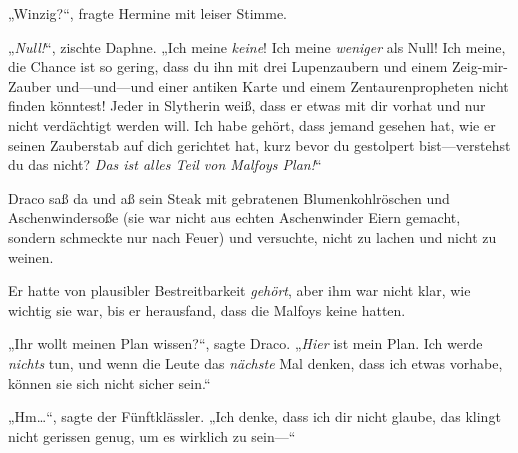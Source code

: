 „Winzig?“, fragte Hermine mit leiser Stimme.

„\emph{Null!}“, zischte Daphne. „Ich meine \emph{keine}! Ich meine \emph{weniger} als Null! Ich meine, die Chance ist so gering, dass du ihn mit drei Lupenzaubern und einem Zeig-mir-Zauber und—und—und einer antiken Karte und einem Zentaurenpropheten nicht finden könntest! Jeder in Slytherin weiß, dass er etwas mit dir vorhat und nur nicht verdächtigt werden will. Ich habe gehört, dass jemand gesehen hat, wie er seinen Zauberstab auf dich gerichtet hat, kurz bevor du gestolpert bist—verstehst du das nicht? \emph{Das ist alles Teil von Malfoys Plan!}“

\later

Draco saß da und aß sein Steak mit gebratenen Blumenkohlröschen und Aschenwindersoße (sie war nicht aus echten Aschenwinder Eiern gemacht, sondern schmeckte nur nach Feuer) und versuchte, nicht zu lachen und nicht zu weinen.

Er hatte von plausibler Bestreitbarkeit \emph{gehört}, aber ihm war nicht klar, wie wichtig sie war, bis er herausfand, dass die Malfoys keine hatten.

„Ihr wollt meinen Plan wissen?“, sagte Draco. „\emph{Hier} ist mein Plan. Ich werde \emph{nichts} tun, und wenn die Leute das \emph{nächste} Mal denken, dass ich etwas vorhabe, können sie sich nicht sicher sein.“

„Hm…“, sagte der Fünftklässler. „Ich denke, dass ich dir nicht glaube, das klingt nicht gerissen genug, um es wirklich zu sein—“

